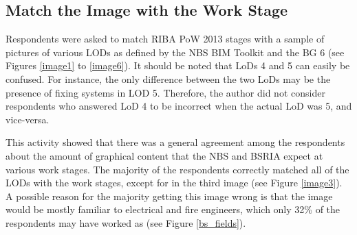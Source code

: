 
\subsection{Match the Image with the Work Stage}

Respondents were asked to match RIBA PoW 2013 stages with a sample of pictures of various LODs as defined by the NBS BIM Toolkit and %
the BG 6 (see Figures \ref{image1} to \ref{image6}).
It should be noted that LoDs 4 and 5 can easily be confused.
For instance, the only difference between the two LoDs may be the presence of fixing systems in LOD 5.
Therefore, the author did not consider respondents who answered LoD 4 to be incorrect when the actual LoD was 5, and vice-versa.

This activity showed that there was a general agreement among the respondents about the amount of graphical content that the NBS and BSRIA expect at various work stages.
The majority of the respondents correctly matched all of the LODs with the work stages, except for in the third image (see Figure \ref{image3}).
A possible reason for the majority getting this image wrong is that the image would be mostly familiar to electrical and fire engineers, which only 32\% of the respondents may have worked as (see Figure \ref{bs_fields}).




